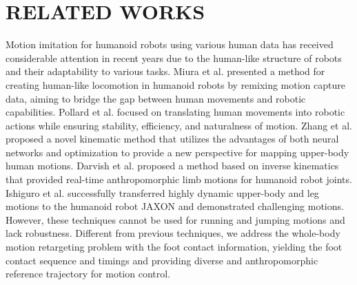 \documentclass[a4paper, 10pt, conference]{ieeeconf}      %
\begin{document}
\section{RELATED WORKS}
Motion imitation for humanoid robots using various human data has received considerable attention in recent years due to the human-like structure of robots and their adaptability to various tasks. Miura et al. \cite{c19} presented a method for creating human-like locomotion in humanoid robots by remixing motion capture data, aiming to bridge the gap between human movements and robotic capabilities. Pollard et al. \cite{c20}focused on translating human movements into robotic actions while ensuring stability, efficiency, and naturalness of motion. Zhang et al.\cite{c10} proposed a novel kinematic method that utilizes the advantages of both neural networks and optimization to provide a new perspective for mapping upper-body human motions. Darvish et al. \cite{c21} proposed a method based on inverse kinematics that provided real-time anthropomorphic limb motions for humanoid robot joints. Ishiguro et al. \cite{c22} successfully transferred highly dynamic upper-body and leg motions to the humanoid robot JAXON and demonstrated challenging motions. However, these techniques cannot be used for running and jumping motions and lack robustness. Different from previous techniques, we address the whole-body motion retargeting problem with the foot contact information, yielding the foot contact sequence and timings and providing diverse and anthropomorphic reference trajectory for motion control.
\end{document}
